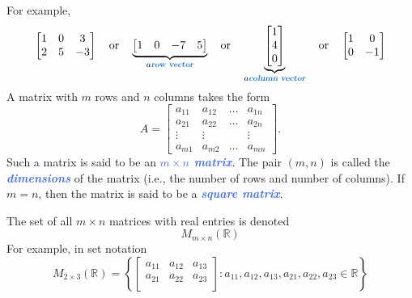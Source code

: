 \documentclass[10pt]{article}
\newcommand{\demph}[1]{\textcolor{RoyalBlue}{\textbf{\slshape #1}}} %
\theoremstyle{definition}
\newcommand{\R}{\mathbb{R}}           %
\begin{document}
For example,
\begin{equation*}
  \begin{bmatrix}
    1&0&3\\
    2&5&-3
  \end{bmatrix}
  \quad \text{or} \quad
  \underbrace{\begin{bmatrix}
    1&0&-7&5
  \end{bmatrix}}_{a \demph{row vector}}
  \quad \text{or} \quad
  \underbrace{\begin{bmatrix}
    1\\4\\0
  \end{bmatrix}}_{a \demph{column vector}}
  \quad \text{or} \quad
  \begin{bmatrix}
    1&0\\
    0&-1
  \end{bmatrix}
\end{equation*}
A matrix with $m$ rows and $n$ columns takes the form
\begin{equation*}
  A=
  \begin{bmatrix}
    a_{11}&a_{12}&\ldots& a_{1n}\\
    a_{21}&a_{22}&\ldots& a_{2n}\\
    \vdots&\vdots & &\vdots \\
    a_{m1}&a_{m2}&\ldots& a_{mn}
  \end{bmatrix}.
\end{equation*}
Such a matrix is said to be an \demph{$m\times n$ matrix}. The pair $(m,n)$
is called the \demph{dimensions} of the matrix (i.e., the number of rows and
number of columns). If $m=n$, then the matrix is said to be a \demph{square matrix}.

The set of all $m\times n$ matrices with real entries is denoted
\begin{equation*}
  M_{m\times n}(\R)
\end{equation*}
For example, in set notation
\begin{equation*}
  M_{2\times 3}(\R) = \left\{
    \begin{bmatrix}
      a_{11}&a_{12}&a_{13}\\
      a_{21}&a_{22}&a_{23}\\
    \end{bmatrix}
    :
    a_{11},a_{12},a_{13},a_{21},a_{22},a_{23}\in \R 
  \right\} 
\end{equation*}
\end{document}
